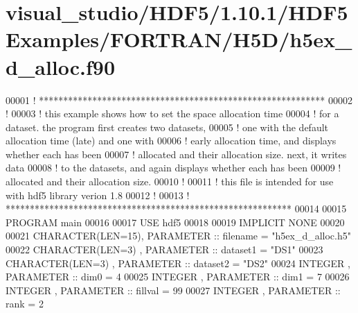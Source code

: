 \hypertarget{visual__studio_2_h_d_f5_21_810_81_2_h_d_f5_examples_2_f_o_r_t_r_a_n_2_h5_d_2h5ex__d__alloc_8f90_source}{}\section{visual\+\_\+studio/\+H\+D\+F5/1.10.1/\+H\+D\+F5\+Examples/\+F\+O\+R\+T\+R\+A\+N/\+H5\+D/h5ex\+\_\+d\+\_\+alloc.f90}
\label{visual__studio_2_h_d_f5_21_810_81_2_h_d_f5_examples_2_f_o_r_t_r_a_n_2_h5_d_2h5ex__d__alloc_8f90_source}

\begin{DoxyCode}
00001 \textcolor{comment}{! ***********************************************************}
00002 \textcolor{comment}{!}
00003 \textcolor{comment}{!  this example shows how to set the space allocation time}
00004 \textcolor{comment}{!  for a dataset.  the program first creates two datasets,}
00005 \textcolor{comment}{!  one with the default allocation time (late) and one with}
00006 \textcolor{comment}{!  early allocation time, and displays whether each has been}
00007 \textcolor{comment}{!  allocated and their allocation size.  next, it writes data}
00008 \textcolor{comment}{!  to the datasets, and again displays whether each has been}
00009 \textcolor{comment}{!  allocated and their allocation size.}
00010 \textcolor{comment}{!}
00011 \textcolor{comment}{!  this file is intended for use with hdf5 library verion 1.8}
00012 \textcolor{comment}{!}
00013 \textcolor{comment}{! ***********************************************************}
00014 
00015 \textcolor{keyword}{PROGRAM} main
00016 
00017   \textcolor{keywordtype}{USE }hdf5
00018 
00019   \textcolor{keywordtype}{IMPLICIT NONE}
00020 
00021   \textcolor{keywordtype}{CHARACTER(LEN=15)}, \textcolor{keywordtype}{PARAMETER} :: filename = \textcolor{stringliteral}{"h5ex\_d\_alloc.h5"}
00022   \textcolor{keywordtype}{CHARACTER(LEN=3)} , \textcolor{keywordtype}{PARAMETER} :: dataset1 = \textcolor{stringliteral}{"DS1"}
00023   \textcolor{keywordtype}{CHARACTER(LEN=3)} , \textcolor{keywordtype}{PARAMETER} :: dataset2 = \textcolor{stringliteral}{"DS2"}
00024   \textcolor{keywordtype}{INTEGER}          , \textcolor{keywordtype}{PARAMETER} :: dim0     = 4
00025   \textcolor{keywordtype}{INTEGER}          , \textcolor{keywordtype}{PARAMETER} :: dim1     = 7
00026   \textcolor{keywordtype}{INTEGER}          , \textcolor{keywordtype}{PARAMETER} :: fillval  = 99
00027   \textcolor{keywordtype}{INTEGER}          , \textcolor{keywordtype}{PARAMETER} :: rank     = 2

\end{DoxyCode}

